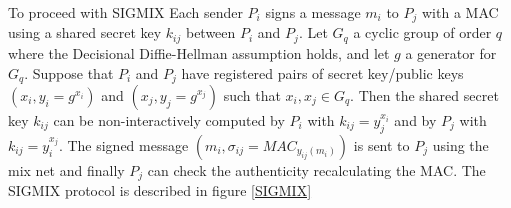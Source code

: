 \documentclass{acm_proc_article-sp}
\begin{document}
To proceed with SIGMIX Each sender $P_i$ signs
a message $m_i$ to $P_j$ with a MAC using a shared secret key $k_{ij}$ between $P_i$ and $P_j$.
Let $G_q$ a cyclic group of order $q$ where the Decisional Diffie-Hellman
assumption holds, and let $g$ a generator for $G_q$. Suppose that $P_i$ and $P_j$ have registered pairs of
secret key/public keys $(x_i, y_i=g^{x_i})$ and $(x_j, y_j=g^{x_j})$ such that $x_i, x_j \in G_q$.
Then the shared secret key $k_{ij}$ can be non-interactively computed by $P_i$ with $k_{ij}=y_j^{x_i}$ and by
$P_j$ with $k_{ij}=y_i^{x_j}$. The signed message $(m_i, \sigma_{ij}=MAC_{y_{ij}(m_i)})$ is sent to $P_j$
using the mix net and finally $P_j$ can check the authenticity recalculating the MAC. The SIGMIX protocol is
described in figure \ref{SIGMIX}

\begin{figure}
\end{figure}
\end{document}
